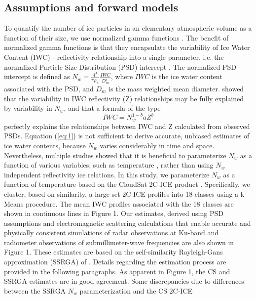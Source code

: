 \documentclass{ametsocV6.1}
\begin{document}
\subsection{Assumptions and forward models}
To quantify the number of ice particles in an elementary atmospheric volume as a function of their size, we use
normalized gamma functions \citep{bringi2003}.  The benefit of normalized gamma functions is that they 
encapsulate the variability of Ice Water Content (IWC) - reflectivity relationship into a single parameter,
i.e. the 
normalized Particle Size Distribution (PSD) intercept \citep{testud2001,bringi2003}. The normalized
PSD intercept is defined as $N_w=\frac {4^4} {\pi \rho_w} \frac {IWC} {D_m^4}$, where $IWC$ is the ice water 
content associated with the PSD, and $D_m$ is the mass weighted mean diameter.  \cite{testud2001} showed 
that the variability in IWC reflectivity (Z) relationships may be fully explained by variability in $N_w$, and 
that a formula of the type
\begin{equation}
IWC=N_w^{1-b}aZ^b \label{eq:1}
\end{equation}
perfectly explains the relationships between IWC and Z calculated from observed PSDs. Equation (\ref{eq:1}) is not 
sufficient to derive accurate, unbiased estimates of ice water contents, because $N_w$ varies considerably in 
time and space. Nevertheless, multiple studies showed that it is beneficial to parameterize $N_w$ as a function 
of various variables, such as temperature \citep{hogan2006retrieval, delanoe2008variational,deng2010tropical}, 
rather than using $N_w$ independent reflectivity ice relations.  In this study, we parameterize
$N_w$ as a function of temperature based on the CloudSat 2C-ICE product \citep{deng2010tropical,deng2013evaluation}.  
Specifically, we cluster, based on similarity, a large set 2C-ICE profiles into 18 classes using a k-Means 
procedure. The mean IWC profiles associated with the 18 classes are shown in continuous lines in Figure 1.  
Our estimates, derived using PSD assumptions and electromagnetic scattering calculations that enable 
accurate and physically consistent simulations of radar observations at Ku-band and radiometer observations of 
submillimeter-wave frequencies are also shown in Figure 1. These estimates are based on the self-similarity 
Rayleigh-Gans approximation (SSRGA) of \cite{hogan2017ssrga}. Details regarding the
estimation process are provided in the following paragraphs.  As apparent in Figure 1, the CS and SSRGA estimates are in good 
agreement.  Some discrepancies due to differences between the SSRGA $N_w$ parameterization and the CS 2C-ICE 
\end{document}
